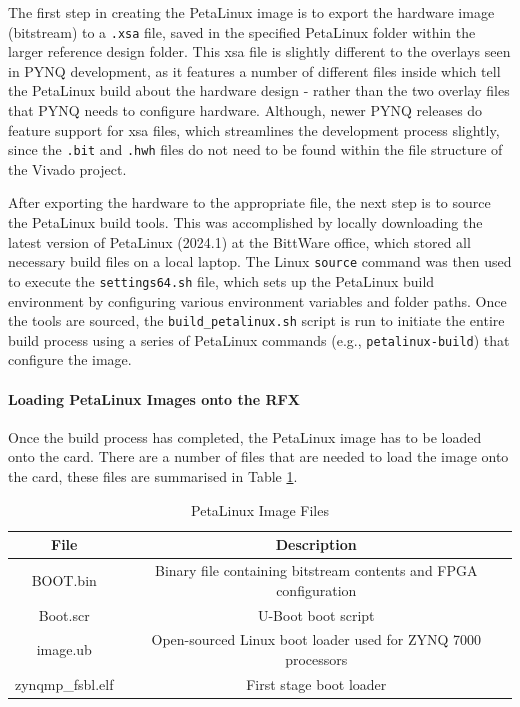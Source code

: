 \documentclass[12pt, a4paper]{article}
\begin{document}
The first step in creating the PetaLinux image is to export the hardware image (bitstream) to a \texttt{.xsa} file, saved in the specified PetaLinux folder within the larger reference design folder. This xsa file is slightly different to the overlays seen in PYNQ development, as it features a number of different files inside which tell the PetaLinux build about the hardware design - rather than the two overlay files that PYNQ needs to configure hardware. Although, newer PYNQ releases do feature support for xsa files, which streamlines the development process slightly, since the \texttt{.bit} and \texttt{.hwh} files do not need to be found within the file structure of the Vivado project.

After exporting the hardware to the appropriate file, the next step is to source the PetaLinux build tools. This was accomplished by locally downloading the latest version of PetaLinux (2024.1) at the BittWare office, which stored all necessary build files on a local laptop. The Linux \texttt{source} command was then used to execute the \texttt{settings64.sh} file, which sets up the PetaLinux build environment by configuring various environment variables and folder paths. Once the tools are sourced, the \texttt{build\_petalinux.sh} script is run to initiate the entire build process using a series of PetaLinux commands (e.g., \texttt{petalinux-build}) that configure the image.

\paragraph{Loading PetaLinux Images onto the RFX}

Once the build process has completed, the PetaLinux image has to be loaded onto the card. There are a number of files that are needed to load the image onto the card, these files are summarised in Table \ref{tab:PetaLinux Image files}.

\begin{table}[h]
    \centering
    \begin{tabular}{|c|c|}\hline
        \textbf{File} & \textbf{Description}\\ \hline
        BOOT.bin &  Binary file containing bitstream contents and FPGA configuration \\ \hline
        Boot.scr &  U-Boot boot script \\\hline
        image.ub &  Open-sourced Linux boot loader used for ZYNQ 7000 processors \cite{Uboot}\\\hline
        zynqmp\_fsbl.elf & First stage boot loader \\\hline
    \end{tabular}
    \caption{PetaLinux Image Files}
    \label{tab:PetaLinux Image files}
\end{table}
\end{document}
